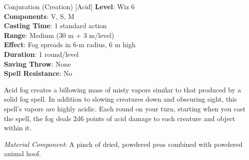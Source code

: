 {Conjuration (Creation) [Acid]}
{
	\textbf{Level}: Wiz 6\\
	\textbf{Components}: V, S, M\\
	\textbf{Casting Time}: 1 standard action\\
	\textbf{Range}: Medium (30 m + 3 m/level)\\
	\textbf{Effect}: Fog spreads in 6-m radius, 6 m high\\
	\textbf{Duration}: 1 round/level\\
	\textbf{Saving Throw}: None\\
	\textbf{Spell Resistance}: No\\
}
{
	Acid fog creates a billowing mass of misty vapors similar to that produced by a solid fog spell. In addition to slowing creatures down and obscuring sight, this spell’s vapors are highly acidic. Each round on your turn, starting when you cast the spell, the fog deals 2d6 points of acid damage to each creature and object within it.

	\textit{Material Component}: A pinch of dried, powdered peas combined with powdered animal hoof.
}